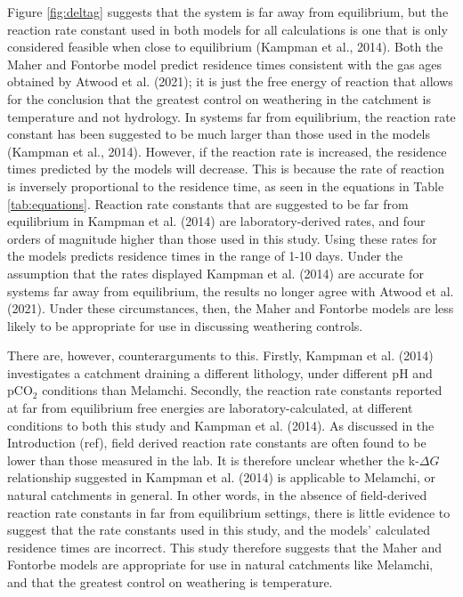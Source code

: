 Figure \ref{fig:deltag} suggests that the system is far away from equilibrium, but the reaction rate constant used in both models for all calculations is one that is only considered feasible when close to equilibrium (Kampman et al., 2014). Both the Maher and Fontorbe model predict residence times consistent with the gas ages obtained by Atwood et al. (2021); it is just the free energy of reaction that allows for the conclusion that the greatest control on weathering in the catchment is temperature and not hydrology. In systems far from equilibrium, the reaction rate constant has been suggested to be much larger than those used in the models (Kampman et al., 2014). However, if the reaction rate is increased, the residence times predicted by the models will decrease. This is because the rate of reaction is inversely proportional to the residence time, as seen in the equations in Table \ref{tab:equations}. Reaction rate constants that are suggested to be far from equilibrium in Kampman et al. (2014) are laboratory-derived rates, and four orders of magnitude higher than those used in this study. Using these rates for the models predicts residence times in the range of 1-10 days. Under the assumption that the rates displayed Kampman et al. (2014) are accurate for systems far away from equilibrium, the results no longer agree with Atwood et al. (2021). Under these circumstances, then, the Maher and Fontorbe models are less likely to be appropriate for use in discussing weathering controls. 

\bsk

There are, however, counterarguments to this. Firstly, Kampman et al. (2014) investigates a catchment draining a different lithology, under different pH and pCO$_2$ conditions than Melamchi. Secondly, the reaction rate constants reported at far from equilibrium free energies are laboratory-calculated, at different conditions to both this study and Kampman et al. (2014). As discussed in the Introduction (ref), field derived reaction rate constants are often found to be lower than those measured in the lab. It is therefore unclear whether the k-$\Delta G$ relationship suggested in Kampman et al. (2014) is applicable to Melamchi, or natural catchments in general. In other words, in the absence of field-derived reaction rate constants in far from equilibrium settings, there is little evidence to suggest that the rate constants used in this study, and the models' calculated residence times are incorrect. This study therefore suggests that the Maher and Fontorbe models are appropriate for use in natural catchments like Melamchi, and that the greatest control on weathering is temperature.




